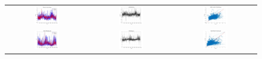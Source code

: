 \begin{figure}[ht!]
  \centering
  \begin{tabular}{ccc}
    \includegraphics[width=0.32\textwidth]{graphs/hybrid/72 hours/mean_fr/actual vs forecast.jpg} &
    \includegraphics[width=0.32\textwidth]{graphs/hybrid/72 hours/mean_fr/residuals.jpg} &
    \includegraphics[width=0.32\textwidth]{graphs/hybrid/72 hours/mean_fr/scatter plot.jpg} \\
    \includegraphics[width=0.32\textwidth]{graphs/hybrid/72 hours/s_wht/actual vs forecast.jpg} &
    \includegraphics[width=0.32\textwidth]{graphs/hybrid/72 hours/s_wht/residuals.jpg} &
    \includegraphics[width=0.32\textwidth]{graphs/hybrid/72 hours/s_wht/scatter plot.jpg} \\

\end{tabular}
\end{figure}
